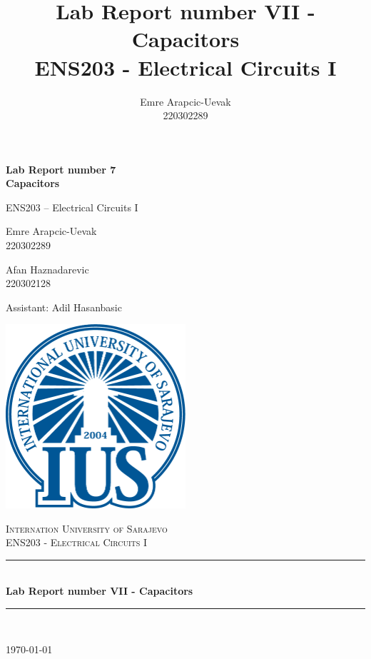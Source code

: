 \documentclass[a4paper, 10pt]{article}
\title{Lab Report number VII - Capacitors\\
	ENS203 - Electrical Circuits I}
\author{Emre Arapcic-Uevak\\220302289}
\date{}
\begin{document}
	\begin{titlepage}
		\begin{center}

			{\Large\bfseries Lab Report number 7 \\[0.5em] Capacitors\par}
			\vspace{1cm} %

			{\large ENS203 – Electrical Circuits I\par}
			\vspace{1cm} %

			{\large Emre Arapcic-Uevak \\ 220302289\par}
			\vspace{1cm} %

			{\large Afan Haznadarevic \\ 220302128\par}
			\vspace{.5cm} %

			{\large Assistant: Adil Hasanbasic\par}
			\includegraphics[width=0.5\textwidth]{Logo.png}
			\vspace{5mm}
			
			\textsc{\LARGE Internation University of Sarajevo}\\[1.5cm]
			\textsc{\Large ENS203 - Electrical Circuits I}\\[0.5cm]
			
			\rule{\linewidth}{0.5mm} \\[0.4cm]
			{ \huge \bfseries Lab Report number VII - Capacitors}\\[0.4cm]
			\rule{\linewidth}{0.5mm} \\[1.5cm]
			
			\vfill
			
			{\large \today}
		\end{center}
	\end{titlepage}
	\pagebreak
\end{document}
